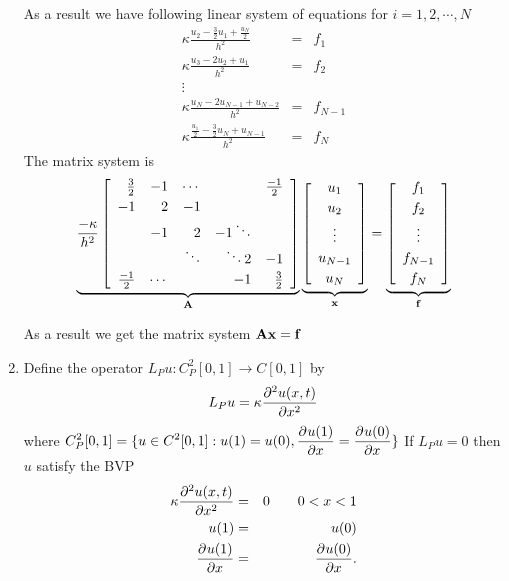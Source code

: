 \begin{solution}
\begin{enumerate}
As a result we have following linear system of equations for $i=1,2,\cdots,N$
\begin{eqnarray*}
 \kappa \frac{u_{2}-\frac{3}{2} u_1+ \frac{u_N}{2}}{h^2} &=&f_1\\
\kappa \frac{u_{3}- 2u_2 + u_{1} } {h^2} &=& f_2 \\
\vdots
\\
\kappa \frac{u_{N}- 2u_{N-1} + u_{N-2} } {h^2}&=& f_{N-1}\\
\kappa \frac{\frac{u_1}{2}- \frac{3}{2} u_N+ u_{N-1} } {h^2} &=& f_N
\end{eqnarray*}
The matrix system is
\begin{eqnarray*}
 \underbrace{\frac{-\kappa}{h^2}\left[\begin{array}{rrrrr}
              \frac{3}{2} & -1 & \cdots & &\frac{-1}{2}\\[0.25em]
               -1 &  2 & -1 &  \\
                 &  -1  &  2 & -1 \ddots \\
                 & & \ddots & \ddots 2& -1 \\[0.25em]
                 \frac{-1}{2}& \cdots & & -1 &  \frac{3}{2} 
               \end{array}\right]}_{\bf A}
          \underbrace{\left[\begin{array}{c} u_1\\[0.25em] u_2 \\[0.25em] \vdots \\[0.25em] u_{N-1} \\[0.25em] u_N \end{array}\right]}_{\bf x}
 = \underbrace{\left[\begin{array}{c} f_1 \\[0.25em] f_2 \\[0.25em] \vdots \\[0.25em] f_{N-1} \\[0.25em] f_N \end{array}\right]}_{\bf f}
\end{eqnarray*}

As a result we get the matrix system $\bf{A x} = \bf f$

\item Define the operator $L_P u : C_P^2[0,1] \rightarrow C[0,1]$ by 
\[
L_P u=\kappa\frac{\partial^{2} u(x,t)}{\partial x^{2}} 
\]
where $\displaystyle{C_P^2[0,1] = \{ u \in C^2[0,1]: u(1) = u(0), \frac{\partial^{} u(1)}{\partial x^{}} = \frac{\partial^{} u(0)}{\partial x^{}}\}}$
If $L_{P} u = 0$ then $u$ satisfy the BVP
\begin{eqnarray*}
\kappa\frac{\partial^{2} u(x,t)}{\partial x^{2}} &=&0 \qquad 0<x<1\\
                   u(1) &=& u(0)\\
         \frac{\partial^{} u(1)}{\partial x^{}} &=& \frac{\partial^{} u(0)}{\partial x^{}}.
         \end{eqnarray*}
         

\end{enumerate}
\end{solution}
